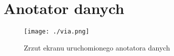 \section{Anotator danych}

\begin{figure}[!htb]
  \texttt{[image: ./via.png]}
    \caption{Zrzut ekranu uruchomionego anotatora danych}
\end{figure}
